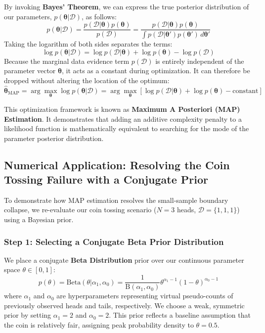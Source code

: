 \documentclass{article}
\begin{document}
By invoking \textbf{Bayes' Theorem}, we can express the true posterior distribution of our parameters, $p(\boldsymbol{\theta} | \mathcal{D})$, as follows:
\begin{equation}
p(\boldsymbol{\theta} | \mathcal{D}) = \frac{p(\mathcal{D} | \boldsymbol{\theta}) p(\boldsymbol{\theta})}{p(\mathcal{D})} = \frac{p(\mathcal{D} | \boldsymbol{\theta}) p(\boldsymbol{\theta})}{\int p(\mathcal{D} | \boldsymbol{\theta}') p(\boldsymbol{\theta}') \, d\boldsymbol{\theta}'}
\end{equation}
Taking the logarithm of both sides separates the terms:
\begin{equation}
\log p(\boldsymbol{\theta} | \mathcal{D}) = \log p(\mathcal{D} | \boldsymbol{\theta}) + \log p(\boldsymbol{\theta}) - \log p(\mathcal{D})
\end{equation}
Because the marginal data evidence term $p(\mathcal{D})$ is entirely independent of the parameter vector $\boldsymbol{\theta}$, it acts as a constant during optimization. It can therefore be dropped without altering the location of the optimum:
\begin{equation}
\hat{\boldsymbol{\theta}}_{\text{MAP}} = \arg\max_{\boldsymbol{\theta}} \log p(\boldsymbol{\theta} | \mathcal{D}) = \arg\max_{\boldsymbol{\theta}} \left[ \log p(\mathcal{D} | \boldsymbol{\theta}) + \log p(\boldsymbol{\theta}) - \text{constant} \right]
\end{equation}

This optimization framework is known as \textbf{Maximum A Posteriori (MAP) Estimation}. It demonstrates that adding an additive complexity penalty to a likelihood function is mathematically equivalent to searching for the mode of the parameter posterior distribution.



\subsection{Numerical Application: Resolving the Coin Tossing Failure with a Conjugate Prior}

To demonstrate how $\text{MAP}$ estimation resolves the small-sample boundary collapse, we re-evaluate our coin tossing scenario ($N=3$ heads, $\mathcal{D} = \{1, 1, 1\}$) using a Bayesian prior.

\subsubsection{Step 1: Selecting a Conjugate Beta Prior Distribution}
We place a conjugate \textbf{Beta Distribution} prior over our continuous parameter space $\theta \in [0, 1]$:
\begin{equation}
p(\theta) = \text{Beta}(\theta | \alpha_1, \alpha_0) = \frac{1}{\text{B}(\alpha_1, \alpha_0)} \theta^{\alpha_1 - 1} (1 - \theta)^{\alpha_0 - 1}
\end{equation}
where $\alpha_1$ and $\alpha_0$ are hyperparameters representing virtual pseudo-counts of previously observed heads and tails, respectively. We choose a weak, symmetric prior by setting $\alpha_1 = 2$ and $\alpha_0 = 2$. This prior reflects a baseline assumption that the coin is relatively fair, assigning peak probability density to $\theta = 0.5$.
\end{document}
